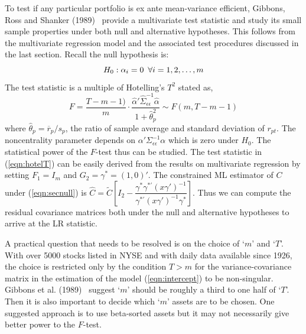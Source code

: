 To test if any particular portfolio is ex ante mean-variance efficient, Gibbons, Ross and Shanker (1989)~\cite{gibbons} provide a multivariate test statistic and study its small sample properties under both null and alternative hypotheses. This follows from the multivariate regression model and the associated test procedures discussed in the last section. Recall the null hypothesis is:
	\begin{equation}\label{eqn:secnull}
	H_0: \alpha_i=0 \enskip \forall i=1,2,\ldots,m
	\end{equation}
The test statistic is a multiple of Hotelling's $T^2$ stated as,
	\begin{equation}\label{eqn:hotelT}
	F= \dfrac{T-m-1)}{m} \cdot \dfrac{\hat{\alpha}' \hat{\Sigma}_{\epsilon\epsilon}^{-1} \hat{\alpha}}{1+\hat{\theta}_p^2} \sim F(m,T-m-1)
	\end{equation}	
where $\hat{\theta}_p= \overline{r}_p/s_p$, the ratio of sample average and standard deviation of $r_{pt}$. The noncentrality parameter depends on $\alpha' \Sigma_{\epsilon\epsilon}^{-1} \alpha$ which is zero under $H_0$. The statistical power of the $F$-test thus can be studied. The test statistic in (\ref{eqn:hotelT}) can be easily derived from the results on multivariate regression by setting $F_1=I_m$ and $G_2=\gamma^*=(1,0)'$. The constrained ML estimator of $C$ under (\ref{eqn:secnull}) is $\hat{C}=\tilde{C} \left[I_2 - \dfrac{\gamma^* \gamma^{*'} (x\gamma')^{-1}}{\gamma^{*'}(x\gamma')^{-1} \gamma^*}\right]$. Thus we can compute the residual covariance matrices both under the null and alternative hypotheses to arrive at the LR statistic. 


A practical question that needs to be resolved is on the choice of `$m$' and `$T$'. With over 5000 stocks listed in NYSE and with daily data available since 1926, the choice is restricted only by the condition $T>m$ for the variance-covariance matrix in the estimation of the model (\ref{eqn:intercept}) to be non-singular. Gibbons et al. (1989)~\cite{gibbons} suggest `$m$' should be roughly a third to one half of `$T$'. Then it is also important to decide which `$m$' assets are to be chosen. One suggested approach is to use beta-sorted assets but it may not necessarily give better power to the $F$-test. 
	
